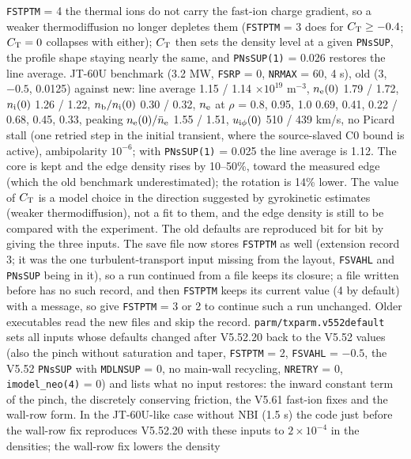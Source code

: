 \documentclass[11pt]{article}
\def\r#1{{\rm#1}}
\begin{document}
\begin{itemize}
  \texttt{FSTPTM} = 4 the thermal ions do not carry the fast-ion charge gradient, so a weaker
  thermodiffusion no longer depletes them (\texttt{FSTPTM} = 3 does for $C_\r{T} \ge -0.4$; $C_\r{T} = 0$
  collapses with either); $C_\r{T}$ then sets the density level at a given \texttt{PNsSUP}, the profile
  shape staying nearly the same, and \texttt{PNsSUP(1)} = 0.026 restores the line average.  JT-60U
  benchmark (3.2 MW, \texttt{FSRP} = 0, \texttt{NRMAX} = 60, 4 s), old (3, $-0.5$, 0.0125) against new:
  line average 1.15 / 1.14 $\times10^{19}$ m$^{-3}$, $n_\r{e}(0)$ 1.79 / 1.72, $n_\r{i}(0)$ 1.26 / 1.22,
  $n_\r{b}/n_\r{i}(0)$ 0.30 / 0.32, $n_\r{e}$ at $\rho$ = 0.8, 0.95, 1.0 0.69, 0.41, 0.22 / 0.68, 0.45,
  0.33, peaking $n_\r{e}(0)/\bar n_\r{e}$ 1.55 / 1.51, $u_{\r{i}\phi}(0)$ 510 / 439 km/s, no Picard stall (one
  retried step in the initial transient, where the source-slaved C0 bound is active), ambipolarity
  $10^{-6}$; with \texttt{PNsSUP(1)} = 0.025 the line average is 1.12.  The core is kept and the edge density
  rises by 10--50\%, toward the measured edge (which the old benchmark underestimated); the
  rotation is 14\% lower.  The value of $C_\r{T}$ is a model choice in the direction suggested by
  gyrokinetic estimates (weaker thermodiffusion), not a fit to them, and the edge density is still to
  be compared with the experiment.  The old defaults are reproduced bit for bit by giving the
  three inputs.  The save file now stores \texttt{FSTPTM} as well (extension record 3; it was the one
  turbulent-transport input missing from the layout, \texttt{FSVAHL} and \texttt{PNsSUP} being in it), so
  a run continued from a file keeps its closure; a file written before has no such record, and then
  \texttt{FSTPTM} keeps its current value (4 by default) with a message, so give \texttt{FSTPTM} = 3 or 2 to
  continue such a run unchanged.  Older executables read the new files and skip the record.
  \texttt{parm/txparm.v552default} sets all inputs whose defaults changed after V5.52.20 back to
  the V5.52 values (also the pinch without saturation and taper, \texttt{FSTPTM} = 2,
  \texttt{FSVAHL} = $-0.5$, the V5.52 \texttt{PNsSUP} with \texttt{MDLNSUP} = 0, no main-wall
  recycling, \texttt{NRETRY} = 0, \texttt{imodel\_neo(4)} = 0) and lists what no input restores: the inward constant term of the
  pinch, the discretely conserving friction, the V5.61 fast-ion fixes and the wall-row form.  In
  the JT-60U-like case without NBI (1.5 s) the code just before the wall-row fix reproduces
  V5.52.20 with these inputs to $2\times10^{-4}$ in the densities; the wall-row fix lowers the density

\end{itemize}
\end{document}
